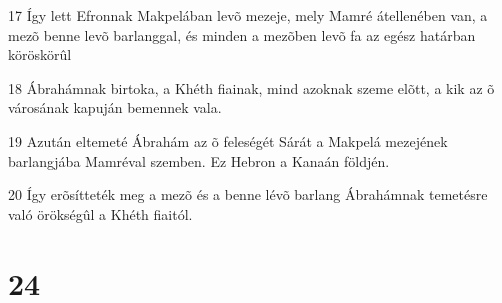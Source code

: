 \par 17 Így lett Efronnak Makpelában levõ mezeje, mely Mamré átellenében van, a mezõ benne levõ barlanggal, és minden a mezõben levõ fa az egész határban köröskörûl
\par 18 Ábrahámnak birtoka, a Khéth fiainak, mind azoknak szeme elõtt, a kik az õ városának kapuján bemennek vala.
\par 19 Azután eltemeté Ábrahám az õ feleségét Sárát a Makpelá mezejének barlangjába Mamréval szemben. Ez Hebron a Kanaán földjén.
\par 20 Így erõsítteték meg a mezõ és a benne lévõ barlang Ábrahámnak temetésre való örökségûl a Khéth fiaitól.

\chapter{24}

